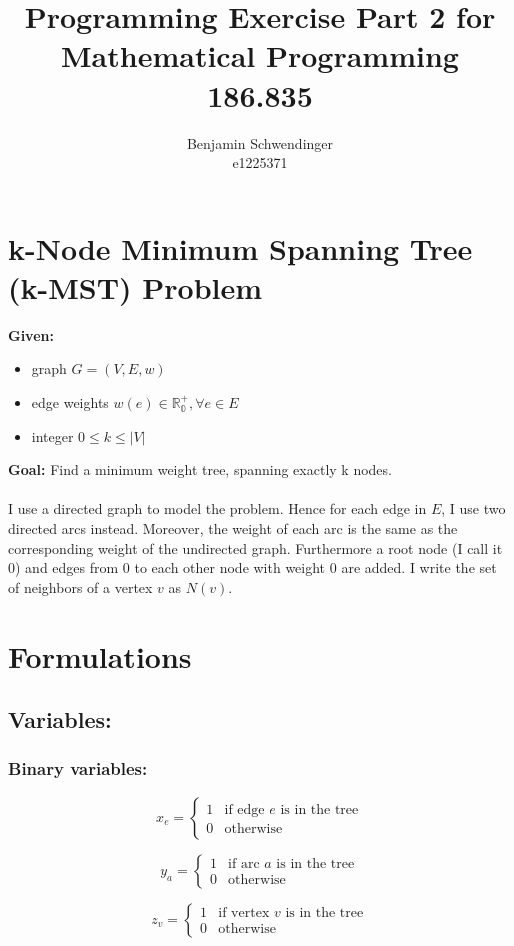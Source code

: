\documentclass[11pt]{article}
\title{Programming Exercise Part 2 for Mathematical Programming 186.835}
\author{Benjamin Schwendinger \\
e1225371}
\begin{document}
\maketitle
\section{k-Node Minimum Spanning Tree (k-MST) Problem}
\textbf{Given:}
\begin{itemize}
\item graph $G = (V,E,w)$
\item edge weights $w(e) \in \mathbb{R_0^+}, \forall e \in E$
\item integer $0 \leq k \leq |V|$
\end{itemize}
\textbf{Goal:} Find a minimum weight tree, spanning exactly k nodes.
\\ \\
I use a directed graph to model the problem. Hence for each edge in $E$, I use two directed arcs instead. Moreover, the weight of each arc is the same as the corresponding weight of the undirected graph. Furthermore a root node (I call it 0) and edges from 0 to each other node with weight 0 are added. I write the set of neighbors of a vertex $v$ as $N(v)$.

\section{Formulations}
\subsection{Variables:}
\subsubsection{Binary variables:}
\[
x_e = 
\begin{cases}
1 & \text{if edge $e$ is in the tree} \\
0 & \text{otherwise} 
\end{cases}
\]

\[
y_a = 
\begin{cases}
1 & \text{if arc $a$ is in the tree} \\
0 & \text{otherwise} 
\end{cases}
\]

\[
z_v = 
\begin{cases}
1 & \text{if vertex $v$ is in the tree} \\
0 & \text{otherwise} 
\end{cases}
\]
\end{document}
